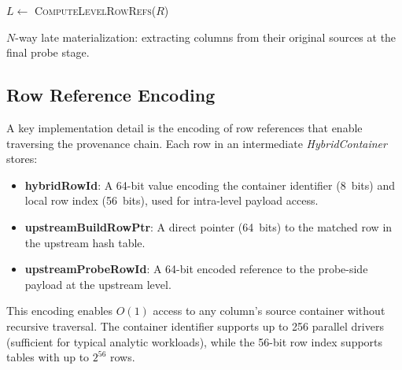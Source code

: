 \begin{algorithm}[t]

$L \gets$ \textsc{ComputeLevelRowRefs}($R$)\;

\ForEach{$(col, src) \in M$}{
  \uIf{$src.type = \textsc{HybridKey}$}{
    $rows \gets L[src.level].buildRowPtrs$\;
    \textsc{ExtractFromRowContainer}($src.container$, $rows$, $src.colIdx$, $O[col]$)\;
  }
  \ElseIf{$src.type = \textsc{HybridPayload} \lor src.type = \textsc{ProbePayload}$}{
    $rowIds \gets L[src.level].rowIds$\;
    \ForEach{$i \in [0, |rowIds|)$}{
      $(cid, rid) \gets \textsc{DecodeRowId}(rowIds[i])$\;
      $O[col][i] \gets src.containers[cid][src.colIdx][rid]$\;
    }
  }
}
\caption{$N$-way late materialization: extracting columns from their original sources at the final probe stage.}
\label{algo:nway-extract}
\end{algorithm}


\subsection{Row Reference Encoding}

A key implementation detail is the encoding of row references that enable traversing the provenance chain.
Each row in an intermediate \emph{HybridContainer} stores:

\begin{itemize}[leftmargin=*]
  \item \textbf{hybridRowId}: A 64-bit value encoding the container identifier (8~bits) and local row index (56~bits), used for intra-level payload access.
  \item \textbf{upstreamBuildRowPtr}: A direct pointer (64~bits) to the matched row in the upstream hash table.
  \item \textbf{upstreamProbeRowId}: A 64-bit encoded reference to the probe-side payload at the upstream level.
\end{itemize}

This encoding enables $O(1)$ access to any column's source container without recursive traversal.
The container identifier supports up to 256 parallel drivers (sufficient for typical analytic workloads), while the 56-bit row index supports tables with up to $2^{56}$ rows.


